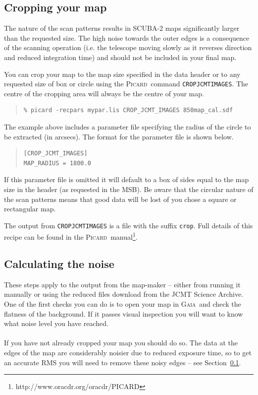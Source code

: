 \documentclass[twoside,11pt]{article}
\newcommand{\xref}[3]{#1}
\newcommand{\xlabel}[1]{}
\renewcommand{\_}{\texttt{\symbol{95}}}
\newenvironment{myquote}{\begin{quote}\begin{small}}{\end{small}\end{quote}}
\newcommand{\gaia}{\xref{\textsc{Gaia}}{sun214}{}}
\newcommand{\picard}{\xref{\textsc{Picard}}{sun265}{}}
\newcommand{\param}[1]{\texttt{#1}}
\begin{document}
\subsection{\xlabel{crop}Cropping your map}
\label{sec:crop}

The nature of the scan patterns results in SCUBA-2 maps significantly
larger than the requested size. The high noise towards the outer edges
is a consequence of the scanning operation (i.e. the telescope moving
slowly as it reverses direction and reduced integration time) and
should not be included in your final map.

You can crop your map to the map size specified in the data header or
to any requested size of box or circle using the \picard\ command
\param{CROP\_JCMT\_IMAGES}. The centre of the cropping area will
always be the centre of your map.
\begin{myquote}
\begin{verbatim}
% picard -recpars mypar.lis CROP_JCMT_IMAGES 850map_cal.sdf
\end{verbatim}
\end{myquote}
The example above includes a parameter file specifying the radius of
the circle to be extracted (in arcsecs).  The format for the parameter
file is shown below.
\begin{myquote}
\begin{verbatim}
[CROP_JCMT_IMAGES]
MAP_RADIUS = 1800.0
\end{verbatim}
\end{myquote}
If this parameter file is omitted it will default to a box of sides
equal to the map size in the header (as requested in the MSB). Be
aware that the circular nature of the scan patterns means that good
data will be lost of you chose a square or rectangular map.

The output from \param{CROP\_JCMT\_IMAGES} is a file with the suffix
\texttt{\_crop}. Full details of this recipe can be found in the \picard\
manual\footnote{http://www.oracdr.org/oracdr/PICARD}.

\subsection{\xlabel{noise}Calculating the noise}

These steps apply to the output from the map-maker -- either from
running it manually or using the reduced files download from the JCMT
Science Archive. One of the first checks you can do is to open your
map in \gaia\ and check the flatness of the background. If it passes
visual inspection you will want to know what noise level you have
reached.
\\ \\
If you have not already cropped your map you should do so. The data at
the edges of the map are considerably noisier due to reduced exposure
time, so to get an accurate RMS you will need to remove these noisy
edges -- see Section~\ref{sec:crop}.
\end{document}
